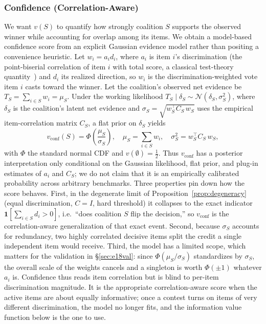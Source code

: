 \documentclass[conference]{IEEEtran}
\begin{document}
\subsubsection{Confidence (Correlation-Aware)}
We want $v(S)$ to quantify how strongly coalition $S$ supports the observed winner while accounting for overlap among its items.
We obtain a model-based confidence score from an explicit Gaussian evidence model rather than positing a convenience heuristic.
Let $w_i = a_i d_i$, where $a_i$ is item $i$'s discrimination (the point-biserial correlation of item $i$ with total score, a classical test-theory quantity~\cite{lordnovick1968}) and $d_i$ its realized direction, so $w_i$ is the discrimination-weighted vote item $i$ casts toward the winner.
Let the coalition's observed net evidence be $T_S=\sum_{i\in S} w_i=\mu_S$.
Under the working likelihood $T_S\mid\delta_S\sim\mathcal{N}(\delta_S,\sigma_S^2)$, where $\delta_S$ is the coalition's latent net evidence and $\sigma_S=\sqrt{w_S^\top C_S\,w_S}$ uses the empirical item-correlation matrix $C_S$, a flat prior on $\delta_S$ yields
\begin{equation}
    v_{\text{conf}}(S) = \Phi\!\left(\frac{\mu_S}{\sigma_S}\right),\quad
    \mu_S = \sum_{i\in S} w_i,\quad
    \sigma_S^2 = w_S^\top C_S\, w_S,
    \label{eq:conf}
\end{equation}
with $\Phi$ the standard normal CDF and $v(\emptyset)=\tfrac12$.
Thus $v_{\text{conf}}$ has a posterior interpretation only conditional on the Gaussian likelihood, flat prior, and plug-in estimates of $a_i$ and $C_S$; we do not claim that it is an empirically calibrated probability across arbitrary benchmarks.
Three properties pin down how the score behaves.
First, in the degenerate limit of Proposition~\ref{prop:degeneracy} (equal discrimination, $C=I$, hard threshold) it collapses to the exact indicator $\mathbf{1}[\sum_{i\in S} d_i>0]$, i.e.\ ``does coalition $S$ flip the decision,'' so $v_{\text{conf}}$ is the correlation-aware generalization of that exact event.
Second, because $\sigma_S$ accounts for redundancy, two highly correlated decisive items split the credit a single independent item would receive.
Third, the model has a limited scope, which matters for the validation in \S\ref{sec:e18val}: since $\Phi(\mu_S/\sigma_S)$ standardizes by $\sigma_S$, the overall scale of the weights cancels and a singleton is worth $\Phi(\pm1)$ whatever $a_i$ is.
Confidence thus reads item correlation but is blind to per-item discrimination magnitude.
It is the appropriate correlation-aware score when the active items are about equally informative; once a contest turns on items of very different discrimination, the model no longer fits, and the information value function below is the one to use.
\end{document}
